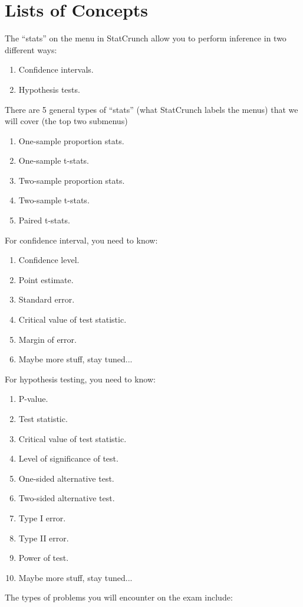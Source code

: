 \documentclass{article}
\begin{document}
\section{Lists of Concepts}
The ``stats'' on the menu in StatCrunch allow you to perform inference
in two different ways:
  \begin{enumerate}
  \item Confidence intervals.
  \item Hypothesis tests.
  \end{enumerate}
There are 5 general types of ``stats'' (what StatCrunch labels the
menus) that we will cover (the top two submenus)
\begin{enumerate}
\item One-sample proportion stats.
\item One-sample t-stats.
\item Two-sample proportion stats.
\item Two-sample t-stats.
\item Paired t-stats.
\end{enumerate}
For confidence interval, you need to know:
\begin{enumerate}
\item Confidence level.
\item Point estimate.
\item Standard error.
\item Critical value of test statistic.
\item Margin of error.
\item Maybe more stuff, stay tuned...
\end{enumerate}
For hypothesis testing, you need to know:
\begin{enumerate}
\item P-value.
\item Test statistic.
\item Critical value of test statistic.
\item Level of significance of test.
\item One-sided alternative test.
\item Two-sided alternative test.
\item Type I error.
\item Type II error.
\item Power of test.
\item Maybe more stuff, stay tuned...
  \end{enumerate}
The types of problems you will encounter on the exam include:
\end{document}
